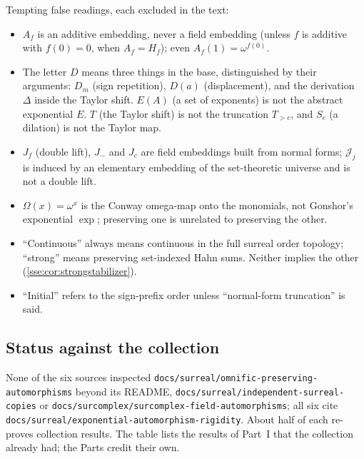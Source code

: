 \documentclass[11pt,a4paper]{article}
\numberwithin{equation}{section}
\theoremstyle{plain}
\theoremstyle{definition}
\theoremstyle{remark}
\newcommand{\fn}[1]{\nolinkurl{#1}}%
\begin{document}
\noindent Tempting false readings, each excluded in the text:
\begin{itemize}
\item $A_f$ is an additive embedding, never a field embedding (unless $f$ is
additive with $f(0)=0$, when $A_f=H_f$); even $A_f(1)=\omega^{f(0)}$.
\item The letter $D$ means three things in the base, distinguished by their
arguments: $D_m$ (sign repetition), $D(a)$ (displacement), and the
derivation $\Delta$ inside the Taylor shift. $E(A)$ (a set of exponents) is
not the abstract exponential $E$. $T$ (the Taylor shift) is not the
truncation $T_{>c}$, and $S_c$ (a dilation) is not the Taylor map.
\item $J_f$ (double lift), $J_-$ and $J_c$ are field embeddings built from
normal forms; $\mathcal J_j$ is induced by an elementary embedding of the
set-theoretic universe and is not a double lift.
\item $\Omega(x)=\omega^x$ is the Conway omega-map onto the monomials, not
Gonshor's exponential $\exp$; preserving one is unrelated to preserving the
other.
\item ``Continuous'' always means continuous in the full surreal order
topology; ``strong'' means preserving set-indexed Hahn sums. Neither
implies the other (\cref{sse:cor:strongstabilizer}).
\item ``Initial'' refers to the sign-prefix order unless ``normal-form
truncation'' is said.
\end{itemize}

\subsection{Status against the collection}\label{sse:sec:status}
None of the six sources inspected
\fn{docs/surreal/omnific-preserving-automorphisms} beyond its README,
\fn{docs/surreal/independent-surreal-copies} or
\fn{docs/surcomplex/surcomplex-field-automorphisms}; all six cite
\fn{docs/surreal/exponential-automorphism-rigidity}. About half of each
re-proves collection results. The table lists the results of Part~I that
the collection already had; the Parts credit their own.
\end{document}
